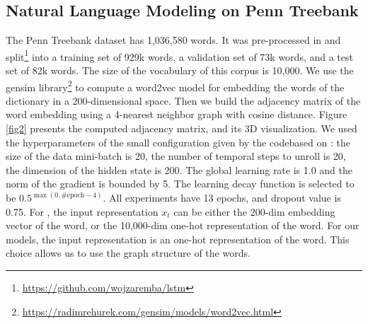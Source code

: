 \documentclass{article} %
\begin{document}
\subsection{Natural Language Modeling on Penn Treebank}



The Penn Treebank dataset has 1,036,580 words. It was pre-processed in \cite{zaremba2014recurrent} and split\footnote{\url{https://github.com/wojzaremba/lstm}} into a training set of 929k words, a validation set of 73k words, and a test set of 82k words. The size of the vocabulary of this corpus is 10,000. We use the gensim library\footnote{\url{https://radimrehurek.com/gensim/models/word2vec.html}} to compute a word2vec model \citep{word2vec} for embedding the words of the dictionary in a 200-dimensional space. Then we build the adjacency matrix of the word embedding using a 4-nearest neighbor graph with cosine distance. Figure \ref{fig2} presents the computed adjacency matrix, and its 3D visualization. We used the hyperparameters of the small configuration given by the code\footnotemark[5] based on \cite{zaremba2014recurrent}: the size of the data mini-batch is 20, the number of temporal steps to unroll is 20, the dimension of the hidden state is 200. The global learning rate is 1.0 and the norm of the gradient is bounded by 5. The learning decay function is selected to be $0.5^{\max(0,\textrm{\#epoch}-4)}$. All experiments have 13 epochs, and dropout value is 0.75. For \cite{zaremba2014recurrent}, the input representation $x_t$ can be either the 200-dim embedding vector of the word, or the 10,000-dim one-hot representation of the word. For our models, the input representation is an one-hot representation of the word. This choice allows us to use the graph structure of the words. 
\end{document}
